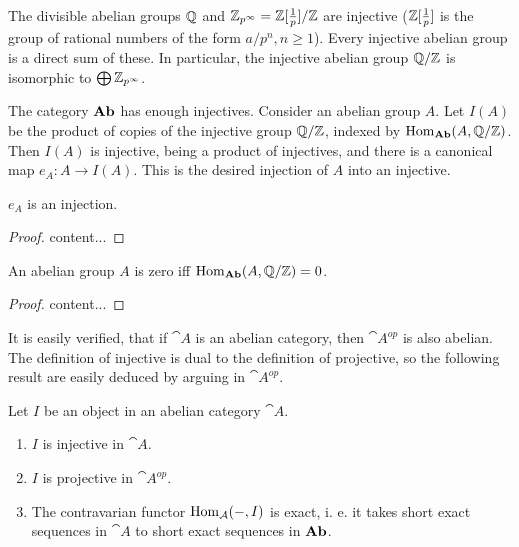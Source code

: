 \begin{example}
	The divisible abelian groups ${\mathbb Q}$ and ${\mathbb Z}_{p^\infty}={\mathbb Z}[\frac{1}{p}]/{\mathbb Z}$ are injective (${\mathbb Z}[\frac{1}{p}]$ is the group of rational numbers of the form $a/p^n,n\geq 1$). Every injective abelian group is a direct sum of these. In particular, the injective abelian group ${\mathbb Q}/{\mathbb Z}$ is isomorphic to $\bigoplus{\mathbb Z}_{p^\infty}$.
\end{example}

The category $\textrm{\textup{\textbf{Ab}}}$ has enough injectives.
Consider an abelian group $A$. Let $I(A)$ be the product of copies of the injective group ${\mathbb Q}/{\mathbb Z}$, indexed by $\operatorname{Hom}_{\textrm{\textup{\textbf{Ab}}}}(A,{\mathbb Q}/{\mathbb Z})$.
Then $I(A)$ is injective, being a product of injectives, and there is a canonical map $e_A:A\rightarrow I(A)$.
This is the desired injection of $A$ into an injective.

\begin{exercise}
	$e_A$ is an injection.
\end{exercise}

\begin{proof}
	content...
\end{proof}

\begin{exercise}
	An abelian group $A$ is zero iff $\operatorname{Hom}_{\textrm{\textup{\textbf{Ab}}}}(A,{\mathbb Q}/{\mathbb Z})=0$.
\end{exercise}

\begin{proof}
	content...
\end{proof}

\begin{remark}
	It is easily verified, that if $\cat{A}$ is an abelian category, then $\cat{A}^{op}$ is also abelian.
	The definition of injective is dual to the definition of projective, so the following result are easily deduced by arguing in $\cat{A}^{op}$.
\end{remark}

\begin{lemma}
	Let $I$ be an object in an abelian category $\cat{A}$.
	\begin{enumerate}[label=(\roman*)]
		\item $I$ is injective in $\cat{A}$.
		
		\item $I$ is projective in $\cat{A}^{op}$.
		
		\item The contravarian functor $\operatorname{Hom}_{\mathcal{A}}(-,I)$ is exact, i. e. it takes short exact sequences in $\cat{A}$ to short exact sequences in $\textrm{\textup{\textbf{Ab}}}$.
	\end{enumerate}
\end{lemma}

